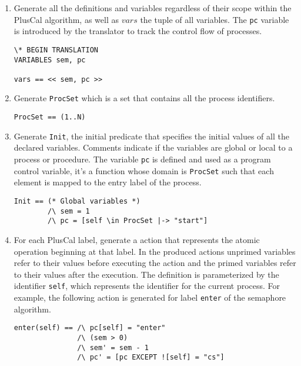 \begin{enumerate}
\item Generate all the definitions and variables regardless of their scope within the PlusCal algorithm, as well as $vars$ the tuple of all variables.
The \verb|pc| variable is introduced by the translator to track the control flow of processes.

\FloatBarrier
\begin{lstlisting}[frame = tlrb, firstnumber = 1]
\* BEGIN TRANSLATION
VARIABLES sem, pc

vars == << sem, pc >>

\end{lstlisting}

\item Generate \verb|ProcSet| which is a set that contains all the process identifiers.

\begin{lstlisting}[frame = tlrb, firstnumber = 1]
ProcSet == (1..N)

\end{lstlisting}

\item  Generate \verb|Init|, the initial predicate that specifies the initial values of all the declared variables. Comments indicate if the variables are global or local to a process or procedure.
The variable \verb|pc| is defined and used as a program control variable, it's a function whose domain is \verb|ProcSet| such that each element is mapped to the entry label of the process.

\begin{lstlisting}[frame = tlrb, firstnumber = 1]
Init == (* Global variables *)
        /\ sem = 1
        /\ pc = [self \in ProcSet |-> "start"]

\end{lstlisting}

\item For each PlusCal label, generate a \tlaplus action that represents the atomic operation beginning at that label. 
In the produced actions unprimed variables refer to their values before executing the action and the primed variables refer to their values after the execution.
The definition is parameterized by the identifier \verb|self|,
which represents the identifier for the current process. For example, the following action is generated for label \texttt{enter} of the semaphore algorithm.

\begin{lstlisting}[frame = tlrb, firstnumber = 1]
enter(self) == /\ pc[self] = "enter"
               /\ (sem > 0)
               /\ sem' = sem - 1
               /\ pc' = [pc EXCEPT ![self] = "cs"]
\end{lstlisting}


\end{enumerate}
